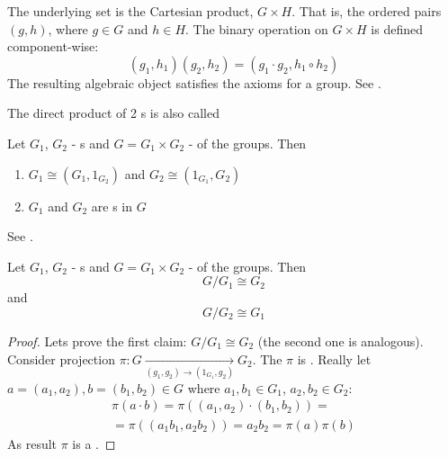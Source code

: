 \begin{appendices}
\begin{definition}
  The underlying set is the Cartesian product, $G \times H$. That is, the
  ordered pairs $\left(g,h\right)$, where $g \in G$ and $h \in H$. 
  The binary operation on $G \times H$ is defined component-wise:
  \[
  \left(g_1,h_1\right)\left(g_2,h_2\right) =
  \left(g_1 \cdot g_2, h_1 \circ h_2\right)
  \]
  The resulting algebraic object satisfies the axioms for a group.
  See \cite{wiki:directproduct}.

  The direct product of 2 s is also called
  
  \label{def:directproduct}
\end{definition}

\begin{property}
  Let $G_1$, $G_2$ - s and $G = G_1 \times G_2$ -
   of the groups. Then
  \begin{enumerate}
  \item $G_1 \cong \left(G_1, 1_{G_2}\right)$ and
    $G_2 \cong \left(1_{G_1}, G_2\right)$
  \item $G_1$ and $G_2$ are s in $G$
  \end{enumerate}
  See \cite{wiki:directproduct}.
  \label{property:directproduct}
\end{property}

\begin{property}
  Let $G_1$, $G_2$ - s and $G = G_1 \times G_2$ -
   of the groups.
  Then
  \[
  G/G_1 \cong G_2
  \]
  and
  \[
  G/G_2 \cong G_1
  \]
  \label{property:directproductquotient}
  \begin{proof}
    Lets prove the first claim:
    $G/G_1 \cong G_2$ (the second one is analogous).
    Consider projection
    $\pi: G \xrightarrow[(g_1, g_2) \to (1_{G_1}, g_2)]{} G_2$. The
    $\pi$ is . Really
    let $a = (a_1, a_2), b = (b_1, b_2) \in G$ where
    $a_{1}, b_1 \in G_1$, $a_2, b_{2} \in G_2$:
    \begin{eqnarray}
      \pi\left(a \cdot b\right) = \pi\left(
      (a_1, a_2) \cdot (b_1, b_2)
      \right) =
      \nonumber \\
      = \pi\left(
      (a_1 b_1, a_2 b_2)
      \right) = a_2 b_2 =
      \pi\left(a\right) \pi\left(b\right)
      \nonumber
    \end{eqnarray}
    As result $\pi$ is a .
    

\end{proof}
\end{property}
\end{appendices}

